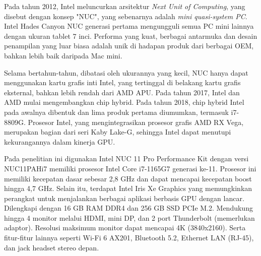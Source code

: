 Pada tahun 2012, Intel meluncurkan arsitektur \textit{Next Unit of Computing}, yang disebut dengan konsep "NUC", yang sebenarnya adalah \textit{mini quasi-system PC}. Intel Hades Canyon NUC generasi pertama mengungguli semua PC mini lainnya dengan ukuran tablet 7 inci. Performa yang kuat, berbagai antarmuka dan desain penampilan yang luar biasa adalah unik di hadapan produk dari berbagai OEM, bahkan lebih baik daripada Mac mini\parencite{8858650}.

Selama bertahun-tahun, dibatasi oleh ukurannya yang kecil, NUC hanya dapat menggunakan kartu grafis inti Intel, yang tertinggal di belakang kartu grafis eksternal, bahkan lebih rendah dari AMD APU. Pada tahun 2017, Intel dan AMD mulai mengembangkan chip hybrid. Pada tahun 2018, chip hybrid Intel pada awalnya dibentuk dan lima produk pertama diumumkan, termasuk i7-8809G. Prosesor Intel, yang mengintegrasikan prosesor grafis AMD RX Vega, merupakan bagian dari seri Kaby Lake-G, sehingga Intel dapat menutupi kekurangannya dalam kinerja GPU\parencite{8858650}.

Pada penelitian ini digunakan Intel NUC 11 Pro Performance Kit dengan versi NUC11PAHi7 memiliki prosesor Intel Core i7-1165G7 generasi ke-11. Prosesor ini memiliki kecepatan dasar sebesar 2,8 GHz dan dapat mencapai kecepatan boost hingga 4,7 GHz. Selain itu, terdapat Intel Iris Xe Graphics yang memungkinkan perangkat untuk menjalankan berbagai aplikasi berbasis GPU dengan lancar. Dilengkapi dengan 16 GB RAM DDR4 dan 256 GB SSD PCIe M.2. Mendukung hingga 4 monitor melalui HDMI, mini DP, dan 2 port Thunderbolt (memerlukan adaptor). Resolusi maksimum monitor dapat mencapai 4K (3840x2160). Serta fitur-fitur lainnya seperti Wi-Fi 6 AX201, Bluetooth 5.2, Ethernet LAN (RJ-45), dan jack headset stereo depan.